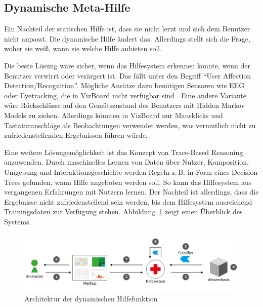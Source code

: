 \documentclass[
	headsepline,
	footsepline,
	fontsize=12pt,
	bibliography=totoc
]{scrbook}
\begin{document}
\subsection{Dynamische Meta-Hilfe}
\label{section:konzeption:meta-hilfe:dynamisch}

Ein Nachteil der statischen Hilfe ist, dass sie nicht lernt und sich dem Benutzer nicht anpasst. Die dynamische Hilfe ändert das. Allerdings stellt sich die Frage, woher sie weiß, wann sie welche Hilfe anbieten soll.


Die beste Lösung wäre sicher, wenn das Hilfesystem erkennen könnte, wenn der Benutzer verwirrt oder verärgert ist. Das fällt unter den Begriff \enquote{User Affection Detection/Recognition}. Mögliche Ansätze dazu benötigen Sensoren wie EEG oder Eyetracking, die in VizBoard nicht verfügbar sind \cite{Li2005, Liao2006}. Eine andere Variante wäre Rückschlüsse auf den Gemütszustand des Benutzers mit Hidden Markov Models \cite{Rabiner1986} zu ziehen. Allerdings könnten in VizBoard nur Mausklicks und Tastaturanschläge als Beobachtungen verwendet werden, was vermutlich nicht zu zufriedenstellenden Ergebnissen führen würde.


Eine weitere Lösungsmöglichkeit ist das Konzept von Trace-Based Reasoning \cite{Cordier2013} anzuwenden. Durch maschinelles Lernen \cite{Kotsiantis2007} von Daten über Nutzer, Komposition, Umgebung und Interaktionsgeschichte werden Regeln z.\,B. in Form eines Decision Trees gefunden, wann Hilfe angeboten werden soll. So kann das Hilfesystem aus vergangenen Erfahrungen mit Nutzern lernen. Der Nachteil ist allerdings, dass die Ergebnisse nicht zufriedenstellend sein werden, bis dem Hilfesystem ausreichend Trainingsdaten zur Verfügung stehen. Abbildung~\ref{figure:architektur-dynhilfe} zeigt einen Überblick des Systems.

\begin{figure}[htbp]
   \centering
   \includegraphics[width=\textwidth]{images/konzeption-architektur-dynhilfe.png}
   \caption{Architektur der dynamischen Hilfefunktion}
   \label{figure:architektur-dynhilfe}
\end{figure}
\end{document}
